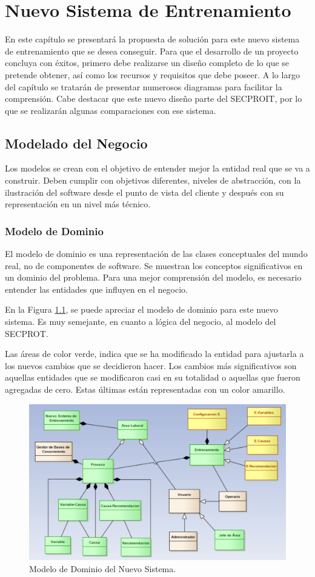 \chapter{Nuevo Sistema de Entrenamiento}\label{chap:2}
En este capítulo se presentará la propuesta de solución para este nuevo sistema de entrenamiento que se desea conseguir. Para que el desarrollo de un proyecto concluya con éxitos, primero debe realizarse un diseño completo de lo que se pretende obtener, así como los recursos y requisitos que debe poseer. A lo largo del capítulo se tratarán de presentar numerosos diagramas para facilitar la comprensión. Cabe destacar que este nuevo diseño parte del SECPROIT, por lo que se realizarán algunas comparaciones con ese sistema.

\section{Modelado del Negocio}
Los modelos se crean con el objetivo de entender mejor la entidad real que se va a construir. Deben cumplir con objetivos diferentes, niveles de abstracción, con la ilustración del software desde el punto de vista del cliente y después con su representación en un nivel más técnico.

\subsection{Modelo de Dominio}
El modelo de dominio es una representación de las clases conceptuales del mundo real, no de componentes de software. Se muestran los conceptos significativos en un dominio del problema. Para una mejor comprensión del modelo, es necesario entender las entidades que influyen en el negocio.

En la Figura \ref{fig:modelD}, se puede apreciar el modelo de dominio para este nuevo sistema. Es muy semejante, en cuanto a lógica del negocio, al modelo del SECPROT.

Las áreas de color verde, indica que se ha modificado la entidad para ajustarla a los nuevos cambios que se decidieron hacer. Los cambios más significativos son aquellas entidades que se modificaron casi en su totalidad o aquellas que fueron agregadas de cero. Estas últimas están representadas con un color amarillo. 

\begin{figure}[h]
\centering
 \includegraphics[width=0.8\linewidth]{imagen/dominio.png}
 \caption{Modelo de Dominio del Nuevo Sistema.}
 \label{fig:modelD} 
\end{figure} 

